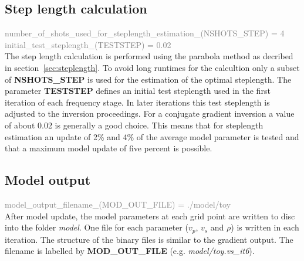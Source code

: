 \subsection{Step length calculation}
\textcolor {Gray}{number\_of\_shots\_used\_for\_steplength\_estimation\_(NSHOTS\_STEP) = 4\\
initial\_test\_steplength\_(TESTSTEP) = 0.02}\vspace{0.1cm}\\
The step length calculation is performed using the parabola method as decribed in section~\ref{sec:steplength}. To avoid long runtimes for the calcultion only a subset of \textbf{NSHOTS\_STEP} is used for the estimation of the optimal steplength. The parameter \textbf{TESTSTEP} defines an initial test steplength used in the first iteration of each frequency stage. In later iterations this test steplength is adjusted to the inversion proceedings. For a conjugate gradient inversion a value of about 0.02 is generally a good choice. This means that for steplength estimation an update of 2\% and 4\% of the average model parameter is tested and that a maximum model update of five percent is possible.
\subsection{Model output}
\textcolor {Gray}{model\_output\_filename\_(MOD\_OUT\_FILE) = ./model/toy}\vspace{0.1cm}\\
After model update, the model parameters at each grid point are written to disc into the folder \textit{model}. One file for each parameter ($v_p$, $v_s$ and $\rho$) is written in each iteration. The structure of the binary files is similar to the gradient output. The filename is labelled by \textbf{MOD\_OUT\_FILE} (e.g. \textit{model/toy.vs\_it6}).  
